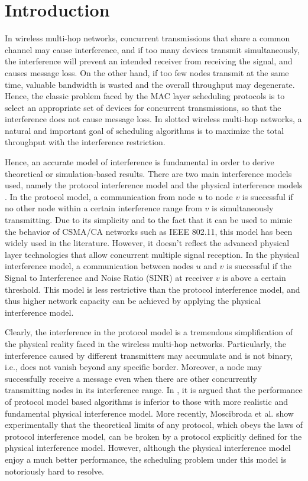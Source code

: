 \documentclass[conference]{IEEEtran}
\begin{document}
\IEEEpeerreviewmaketitle



\section{Introduction}\label{section1}
In wireless multi-hop networks, concurrent transmissions that share
a common channel may cause interference, and if too many devices
transmit simultaneously, the interference will prevent an intended
receiver from receiving the signal, and causes message loss. On the
other hand, if too few nodes transmit at the same time, valuable
bandwidth is wasted and the overall throughput may degenerate.
Hence, the classic problem faced by the MAC layer scheduling
protocols is to select an appropriate set of devices for concurrent
transmissions, so that the interference does not cause message loss.
In slotted wireless multi-hop networks, a natural and important goal
of scheduling algorithms is to maximize the total throughput with
the interference restriction.

Hence, an accurate model of interference is fundamental in order to
derive theoretical or simulation-based results. There are two main
interference models used, namely the protocol interference model and
the physical interference models \cite{gupta2000cwn}. In the
protocol model, a communication from node $u$ to node $v$ is
successful if no other node within a certain interference range from
$v$ is simultaneously transmitting. Due to its simplicity and to the
fact that it can be used to mimic the behavior of CSMA/CA networks
such as IEEE 802.11, this model has been widely used in the
literature. However, it doesn't reflect the advanced physical layer
technologies that allow concurrent multiple signal reception. In the
physical interference model, a communication between nodes $u$ and
$v$ is successful if the Signal to Interference and Noise Ratio
(SINR) at receiver $v$ is above a certain threshold. This model is
less restrictive than the protocol interference model, and thus
higher network capacity can be achieved by applying the physical
interference model.

Clearly, the interference in the protocol model is a tremendous
simplification of the physical reality faced in the wireless
multi-hop networks. Particularly, the interference caused by
different transmitters may accumulate and is not binary, i.e., does
not vanish beyond any specific border. Moreover, a node may
successfully receive a message even when there are other
concurrently transmitting nodes in its interference range. In
\cite{behzad2003pgb,gronkvist2001cbg}, it is argued that the
performance of protocol model based algorithms is inferior to those
with more realistic and fundamental physical interference model.
More recently, Moscibroda et al. \cite{moscibroda2006pdb} show
experimentally that the theoretical limits of any protocol, which
obeys the laws of protocol interference model, can be broken by a
protocol explicitly defined for the physical interference model.
However, although the physical interference model enjoy a much
better performance, the scheduling problem under this model is
notoriously hard to resolve.
\end{document}
